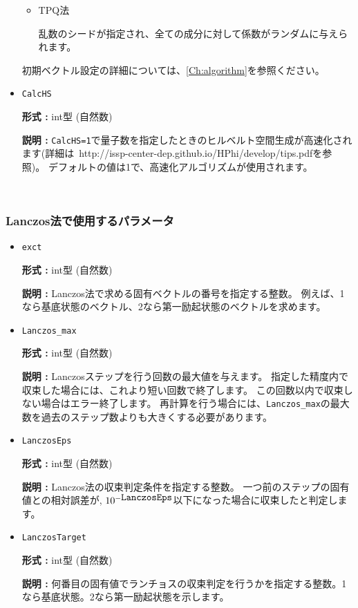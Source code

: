 \begin{itemize}
\begin{itemize}
\item{TPQ法}

乱数のシードが指定され、全ての成分に対して係数がランダムに与えられます。
\end{itemize}
初期ベクトル設定の詳細については、\ref{Ch:algorithm}を参照ください。


 \item \verb|CalcHS|

 {\bf 形式 :} int型 (自然数)

 {\bf 説明 :} \verb|CalcHS=1|で量子数を指定したときのヒルベルト空間生成が高速化されます(詳細は~http://issp-center-dep.github.io/HPhi/develop/tips.pdfを参照)。
デフォルトの値は1で、高速化アルゴリズムが使用されます。
\end{itemize}

~\subsubsection{Lanczos法で使用するパラメータ}

\begin{itemize}
 
 \item  \verb|exct|

{\bf 形式 :} int型 (自然数)

{\bf 説明 :} Lanczos法で求める固有ベクトルの番号を指定する整数。
例えば、1なら基底状態のベクトル、2なら第一励起状態のベクトルを求めます。

\item  \verb|Lanczos_max|

{\bf 形式 :} int型 (自然数)

{\bf 説明 :}  Lanczosステップを行う回数の最大値を与えます。
指定した精度内で収束した場合には、これより短い回数で終了します。
この回数以内で収束しない場合はエラー終了します。
再計算を行う場合には、\verb|Lanczos_max|の最大数を過去のステップ数よりも大きくする必要があります。

\item   \verb|LanczosEps|
   
{\bf 形式 :} int型 (自然数)

{\bf 説明 :} Lanczos法の収束判定条件を指定する整数。
一つ前のステップの固有値との相対誤差が,
$10^{- \verb|LanczosEps|}$以下になった場合に収束したと判定します。

 \item  \verb|LanczosTarget| 
   
 {\bf 形式 :} int型 (自然数)

  {\bf 説明 :} 何番目の固有値でランチョスの収束判定を行うかを指定する整数。1なら基底状態。2なら第一励起状態を示します。
\end{itemize}


